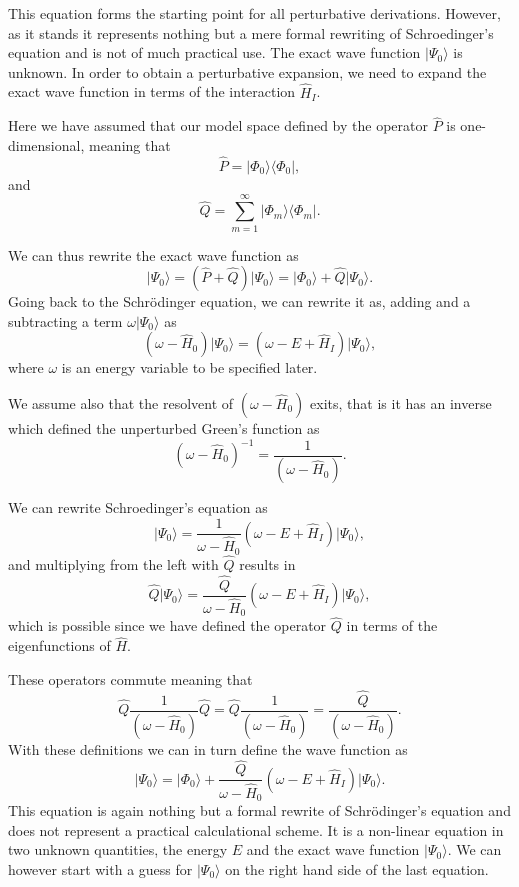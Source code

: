 This equation forms the starting point for all perturbative derivations. However,
as it stands it represents nothing but a mere formal rewriting of Schroedinger's equation and is not of much practical use. The exact wave function $\vert \Psi_0\rangle$ is unknown. In order to obtain a perturbative expansion, we need to expand the exact wave function in terms of the interaction $\hat{H}_I$. 

Here we have assumed that our model space defined by the operator $\hat{P}$ is one-dimensional, meaning that
\[
\hat{P}= \vert \Phi_0\rangle \langle \Phi_0\vert ,
\]
and
\[
\hat{Q}=\sum_{m=1}^{\infty}\vert \Phi_m\rangle \langle \Phi_m\vert .
\]


We can thus rewrite the exact wave function as
\[
\vert \Psi_0\rangle= (\hat{P}+\hat{Q})\vert \Psi_0\rangle=\vert \Phi_0\rangle+\hat{Q}\vert \Psi_0\rangle.
\]
Going back to the Schr\"odinger equation, we can rewrite it as, adding and a subtracting a term $\omega \vert \Psi_0\rangle$ as
\[
\left(\omega-\hat{H}_0\right)\vert \Psi_0\rangle=\left(\omega-E+\hat{H}_I\right)\vert \Psi_0\rangle,
\]
where $\omega$ is an energy variable to be specified later. 


We assume also that the resolvent of $\left(\omega-\hat{H}_0\right)$ exits, that is
it has an inverse which defined the unperturbed Green's function as
\[
\left(\omega-\hat{H}_0\right)^{-1}=\frac{1}{\left(\omega-\hat{H}_0\right)}.
\]

We can rewrite Schroedinger's equation as
\[
\vert \Psi_0\rangle=\frac{1}{\omega-\hat{H}_0}\left(\omega-E+\hat{H}_I\right)\vert \Psi_0\rangle,
\]
and multiplying from the left with $\hat{Q}$ results in
\[
\hat{Q}\vert \Psi_0\rangle=\frac{\hat{Q}}{\omega-\hat{H}_0}\left(\omega-E+\hat{H}_I\right)\vert \Psi_0\rangle,
\]
which is possible since we have defined the operator $\hat{Q}$ in terms of the eigenfunctions of $\hat{H}$.




These operators commute meaning that
\[
\hat{Q}\frac{1}{\left(\omega-\hat{H}_0\right)}\hat{Q}=\hat{Q}\frac{1}{\left(\omega-\hat{H}_0\right)}=\frac{\hat{Q}}{\left(\omega-\hat{H}_0\right)}.
\]
With these definitions we can in turn define the wave function as 
\[
\vert \Psi_0\rangle=\vert \Phi_0\rangle+\frac{\hat{Q}}{\omega-\hat{H}_0}\left(\omega-E+\hat{H}_I\right)\vert \Psi_0\rangle.
\]
This equation is again nothing but a formal rewrite of Schr\"odinger's equation
and does not represent a practical calculational scheme.  
It is a non-linear equation in two unknown quantities, the energy $E$ and the exact
wave function $\vert \Psi_0\rangle$. We can however start with a guess for $\vert \Psi_0\rangle$ on the right hand side of the last equation.



